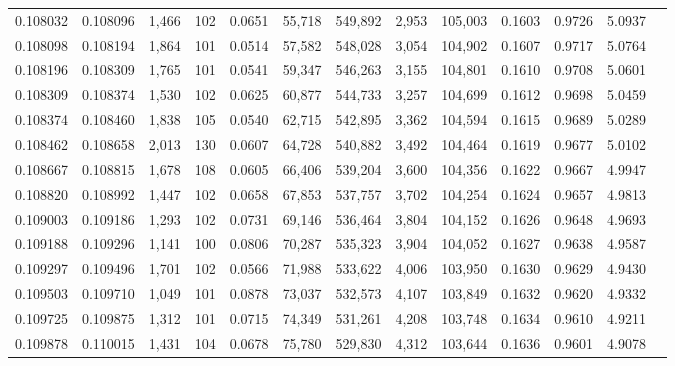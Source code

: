\begin{tabular}{rrrrrrrrrrrrr}
0.108032 & 0.108096 & 1,466 & 102 &                                     0.0651 &  55,718 & 549,892 &   2,953 & 105,003 & 0.1603 & 0.9726 & 5.0937 \\
0.108098 & 0.108194 & 1,864 & 101 &                                     0.0514 &  57,582 & 548,028 &   3,054 & 104,902 & 0.1607 & 0.9717 & 5.0764 \\
0.108196 & 0.108309 & 1,765 & 101 &                                     0.0541 &  59,347 & 546,263 &   3,155 & 104,801 & 0.1610 & 0.9708 & 5.0601 \\
0.108309 & 0.108374 & 1,530 & 102 &                                     0.0625 &  60,877 & 544,733 &   3,257 & 104,699 & 0.1612 & 0.9698 & 5.0459 \\
0.108374 & 0.108460 & 1,838 & 105 &                                     0.0540 &  62,715 & 542,895 &   3,362 & 104,594 & 0.1615 & 0.9689 & 5.0289 \\
0.108462 & 0.108658 & 2,013 & 130 &                                     0.0607 &  64,728 & 540,882 &   3,492 & 104,464 & 0.1619 & 0.9677 & 5.0102 \\
0.108667 & 0.108815 & 1,678 & 108 &                                     0.0605 &  66,406 & 539,204 &   3,600 & 104,356 & 0.1622 & 0.9667 & 4.9947 \\
0.108820 & 0.108992 & 1,447 & 102 &                                     0.0658 &  67,853 & 537,757 &   3,702 & 104,254 & 0.1624 & 0.9657 & 4.9813 \\
0.109003 & 0.109186 & 1,293 & 102 &                                     0.0731 &  69,146 & 536,464 &   3,804 & 104,152 & 0.1626 & 0.9648 & 4.9693 \\
0.109188 & 0.109296 & 1,141 & 100 &                                     0.0806 &  70,287 & 535,323 &   3,904 & 104,052 & 0.1627 & 0.9638 & 4.9587 \\
0.109297 & 0.109496 & 1,701 & 102 &                                     0.0566 &  71,988 & 533,622 &   4,006 & 103,950 & 0.1630 & 0.9629 & 4.9430 \\
0.109503 & 0.109710 & 1,049 & 101 &                                     0.0878 &  73,037 & 532,573 &   4,107 & 103,849 & 0.1632 & 0.9620 & 4.9332 \\
0.109725 & 0.109875 & 1,312 & 101 &                                     0.0715 &  74,349 & 531,261 &   4,208 & 103,748 & 0.1634 & 0.9610 & 4.9211 \\
0.109878 & 0.110015 & 1,431 & 104 &                                     0.0678 &  75,780 & 529,830 &   4,312 & 103,644 & 0.1636 & 0.9601 & 4.9078 \\

\end{tabular}

